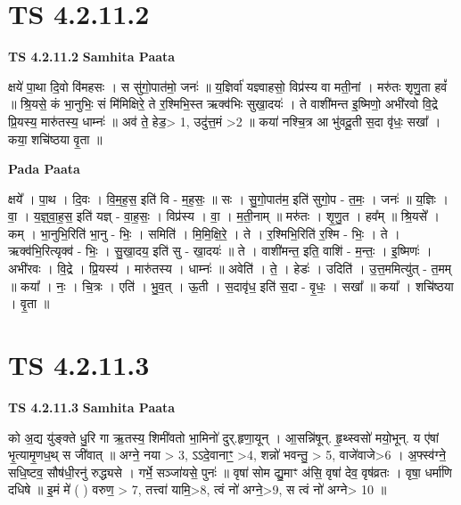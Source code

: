 \documentclass[17pt]{extarticle}
\begin{document}
\section*{ TS 4.2.11.2 }

\textbf{TS 4.2.11.2 } \newline
\textbf{Samhita Paata} \newline

क्षये॑ पा॒था दि॒वो वि॑महसः । स सु॑गो॒पात॑मो॒ जनः॑ ॥ य॒ज्ञिर्वा॑ यज्ञ्वाहसो॒ विप्र॑स्य वा मती॒नां । मरु॑तः शृणु॒ता हवं᳚ ॥ श्रि॒यसे॒ कं भा॒नुभिः॒ सं मि॑मिक्षिरे॒ ते र॒श्मिभि॒स्त ऋक्व॑भिः सुखा॒दयः॑ । ते वाशी॑मन्त इ॒ष्मिणो॒ अभी॑रवो वि॒द्रे प्रि॒यस्य॒ मारु॑तस्य॒ धाम्नः॑ ॥ अव॑ ते॒ हेड॒> 1, उदु॑त्त॒मं >2 ॥ कया॑ नश्चि॒त्र आ भु॑वदू॒ती स॒दा वृ॑धः॒ सखा᳚ । कया॒ शचि॑ष्ठया वृ॒ता ॥ \newline

\textbf{Pada Paata} \newline

क्षये᳚ । पा॒थ । दि॒वः । वि॒म॒ह॒स॒ इति॑ वि - म॒ह॒सः॒ ॥ सः । सु॒गो॒पात॑म॒ इति॑ सुगो॒प - त॒मः॒ । जनः॑ ॥ य॒ज्ञिः । वा॒ । य॒ज्ञ्॒वा॒ह॒स॒ इति॑ यज्ञ् - वा॒ह॒सः॒ । विप्र॑स्य । वा॒ । म॒ती॒नाम् ॥ मरु॑तः । शृ॒णु॒त । हव᳚म् ॥ श्रि॒यसे᳚ । कम् । भा॒नुभि॒रिति॑ भा॒नु - भिः॒ । समिति॑ । मि॒मि॒क्षि॒रे॒ । ते । र॒श्मिभि॒रिति॑ र॒श्मि - भिः॒ । ते । ऋक्व॑भि॒रित्यृक्व॑ - भिः॒ । सु॒खा॒दय॒ इति॑ सु - खा॒दयः॑ ॥ ते । वाशी॑मन्त॒ इति॒ वाशि॑ - म॒न्तः॒ । इ॒ष्मिणः॑ । अभी॑रवः । वि॒द्रे । प्रि॒यस्य॑ । मारु॑तस्य । धाम्नः॑ ॥ अवेति॑ । ते॒ । हेडः॑ । उदिति॑ । उ॒त्त॒ममित्यु॑त् - त॒मम् ॥ कया᳚ । नः॒ । चि॒त्रः । एति॑ । भु॒व॒त् । ऊ॒ती । स॒दावृ॑ध॒ इति॑ स॒दा - वृ॒धः॒ । सखा᳚ ॥ कया᳚ । शचि॑ष्ठया । वृ॒ता ॥  \newline




\section*{ TS 4.2.11.3 }

\textbf{TS 4.2.11.3 } \newline
\textbf{Samhita Paata} \newline

को अ॒द्य यु॑ङ्क्ते धु॒रि गा ऋ॒तस्य॒ शिमी॑वतो भा॒मिनो॑ दुर्.हृणा॒यून् । आ॒सन्नि॑षून्. हृ॒थ्स्वसो॑ मयो॒भून्. य ए॑षां भृ॒त्यामृ॒णध॒थ् स जी॑वात् ॥ अग्ने॒ नया > 3, ऽऽदे॒वानाꣳ॒॒ >4, शन्नो॑ भवन्तु॒ > 5, वाजे॑वाजे>6 । अ॒फ्स्व॑ग्ने॒ सधि॒ष्टव॒ सौष॑धी॒रनु॑ रुद्ध्यसे । गर्भे॒ सञ्जा॑यसे॒ पुनः॑ ॥ वृषा॑ सोम द्यु॒माꣳ अ॑सि॒ वृषा॑ देव॒ वृष॑व्रतः । वृषा॒ धर्मा॑णि दधिषे ॥ इ॒मं मे॑ ( ) वरुण॒ > 7, तत्त्वा॑ यामि॒>8, त्वं नो॑ अग्ने॒>9, स त्वं नो॑ अग्ने> 10 ॥ \newline
\end{document}
